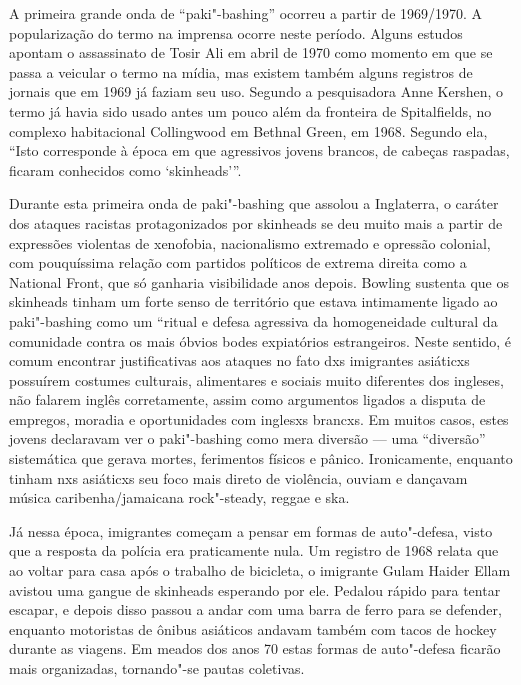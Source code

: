 A primeira grande onda de ``paki"-bashing'' ocorreu a partir de 1969/1970. A popularização do termo na imprensa ocorre neste período. Alguns estudos apontam o assassinato de Tosir Ali em abril de 1970 como momento em que se passa a veicular o termo na mídia, mas existem também alguns registros de jornais que em 1969 já faziam seu uso. Segundo a pesquisadora Anne Kershen, o termo já havia sido usado antes um pouco além da fronteira de Spitalfields, no complexo habitacional Collingwood em Bethnal Green, em 1968. Segundo ela, ``Isto corresponde à época em que agressivos jovens brancos, de cabeças raspadas, ficaram conhecidos como `skinheads'''.

Durante esta primeira onda de paki"-bashing que assolou a Inglaterra, o caráter dos ataques racistas protagonizados por skinheads se deu muito mais a partir de expressões violentas de xenofobia, nacionalismo extremado e opressão colonial, com pouquíssima relação com partidos políticos de extrema direita como a National Front, que só ganharia visibilidade anos depois. Bowling sustenta que os skinheads tinham um forte senso de território que estava intimamente ligado ao paki"-bashing como um ``ritual e defesa agressiva da homogeneidade cultural da comunidade contra os mais óbvios bodes expiatórios estrangeiros. Neste sentido, é comum encontrar justificativas aos ataques no fato dxs imigrantes asiáticxs possuírem costumes culturais, alimentares e sociais muito diferentes dos ingleses, não falarem inglês corretamente, assim como argumentos ligados a disputa de empregos, moradia e oportunidades com inglesxs brancxs. Em muitos casos, estes jovens declaravam ver o paki"-bashing como mera diversão --- uma ``diversão'' sistemática que gerava mortes, ferimentos físicos e pânico. Ironicamente, enquanto tinham nxs asiáticxs seu foco mais direto de violência, ouviam e dançavam música caribenha/jamaicana rock"-steady, reggae e ska.

Já nessa época, imigrantes começam a pensar em formas de auto"-defesa, visto que a resposta da polícia era praticamente nula. Um registro de 1968 relata que ao voltar para casa após o trabalho de bicicleta, o imigrante Gulam Haider Ellam avistou uma gangue de skinheads esperando por ele. Pedalou rápido para tentar escapar, e depois disso passou a andar com uma barra de ferro para se defender, enquanto motoristas de ônibus asiáticos andavam também com tacos de hockey durante as viagens. Em meados dos anos 70 estas formas de auto"-defesa ficarão mais organizadas, tornando"-se pautas coletivas.

